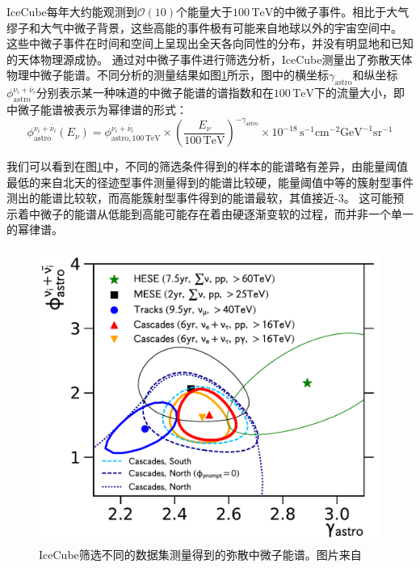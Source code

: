IceCube每年大约能观测到$\mathcal{O}(10)$个能量大于$100\,\mathrm{TeV}$的中微子事件。相比于大气缪子和大气中微子背景，这些高能的事件极有可能来自地球以外的宇宙空间中。
这些中微子事件在时间和空间上呈现出全天各向同性的分布，并没有明显地和已知的天体物理源成协。
通过对中微子事件进行筛选分析，IceCube测量出了弥散天体物理中微子能谱\cite{IceCube_6yr_cascade_spectrum:2020, IceCube_HESE:2020, IceCube_MESE:2014, IceCube_diffse_muon:2021, IceCube_starting_track:2021b}。不同分析的测量结果如图\ref{fig:IceCube_diffuse_spectrum}所示，图中的横坐标$\gamma_\mathrm{astro}$和纵坐标$\phi^{\nu_i+\bar{\nu}_i}_\mathrm{astro}$分别表示某一种味道的中微子能谱的谱指数和在$100\,\mathrm{TeV}$下的流量大小，即中微子能谱被表示为幂律谱的形式：
\begin{equation}
    \phi^{\nu_i+\bar{\nu}_i}_\mathrm{astro}(E_\nu) = \phi^{\nu_i+\bar{\nu}_i}_\mathrm{astro, 100\,TeV} \times \left( \frac{E_\nu}{100\,\mathrm{TeV}} \right)^{-\gamma_\mathrm{astro}} \times 10^{-18} \, \mathrm{s^{-1} cm^{-2} GeV^{-1} sr^{-1}}
    \label{eq:diffse_nu_flux}
\end{equation}

我们可以看到在图\ref{fig:IceCube_diffuse_spectrum}中，不同的筛选条件得到的样本的能谱略有差异，由能量阈值最低的来自北天的径迹型事件\cite{IceCube_diffse_muon:2021}测量得到的能谱比较硬，能量阈值中等的簇射型事件\cite{IceCube_MESE:2014, IceCube_6yr_cascade_spectrum:2020}测出的能谱比较软，而高能簇射型事件\cite{IceCube_HESE:2020}得到的能谱最软，其值接近-3。
这可能预示着中微子的能谱从低能到高能可能存在着由硬逐渐变软的过程，而并非一个单一的幂律谱。

\begin{figure}[htbp]
    \centering
    \includegraphics[width=0.6\linewidth]{img/IceCube_diffuse_spectrum.pdf}
    \caption{IceCube筛选不同的数据集测量得到的弥散中微子能谱。图片来自\cite{IceCube_6yr_cascade_spectrum:2020}}
    \label{fig:IceCube_diffuse_spectrum}
\end{figure}

